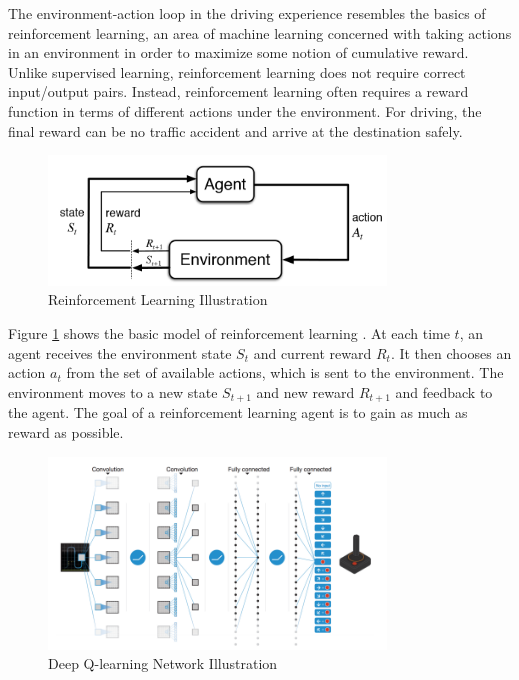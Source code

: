 \documentclass[a4paper]{article}
\begin{document}
The environment-action loop in the driving experience resembles the basics of reinforcement learning, an area of machine learning concerned with taking actions in an environment in order to maximize some notion of cumulative reward. Unlike supervised learning, reinforcement learning does not require correct input/output pairs. Instead, reinforcement learning often requires a reward function in terms of different actions under the environment. For driving, the final reward can be no traffic accident and arrive at the destination safely.

\begin{figure}
    \centering
    \includegraphics[width=0.8\textwidth]{./figures/rl.png}
    \caption{ Reinforcement Learning Illustration \cite{rlIntroduction}}
    \label{fig:RL}
\end{figure}


Figure \ref{fig:RL} shows the basic model of reinforcement learning \cite{rlIntroduction}. At each time $t$, an agent receives the environment state $S_t$ and current reward $R_t$. It then chooses an action $a_t$ from the set of available actions, which is sent to the environment. The environment moves to a new state $S_{t+1}$ and new reward $R_{t+1}$ and feedback to the agent. The goal of a reinforcement learning agent is to gain as much as reward as possible.


\begin{figure}
	\centering
	\includegraphics[width=0.8\textwidth]{./figures/deepq.png}
    \caption{ Deep Q-learning Network Illustration \cite{dqn}}
	\label{fig:deepq}
\end{figure}
\end{document}
